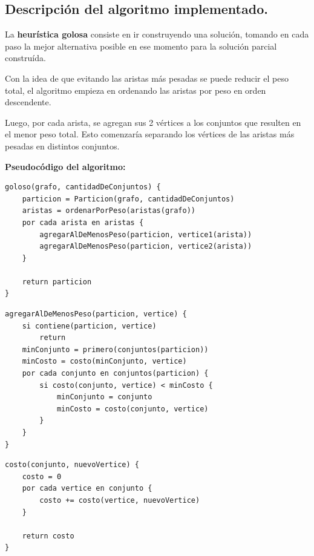 \subsection{Descripción del algoritmo implementado.}
\vspace*{0.3cm}

La \textbf{heurística golosa} consiste en ir construyendo una solución,
tomando en cada paso la mejor alternativa posible en ese momento para la
solución parcial construída.

Con la idea de que evitando las aristas más pesadas se puede reducir el peso
total, el algoritmo empieza en ordenando las aristas por peso en orden
descendente.

Luego, por cada arista, se agregan sus 2 vértices a los conjuntos que resulten en el menor peso total. Esto comenzaría separando los vértices
de las aristas más pesadas en distintos conjuntos.

\vspace*{0.5cm}

\textbf{Pseudocódigo del algoritmo:}

\vspace*{0.3cm}

\begin{verbatim}
goloso(grafo, cantidadDeConjuntos) {
    particion = Particion(grafo, cantidadDeConjuntos)
    aristas = ordenarPorPeso(aristas(grafo))
    por cada arista en aristas {
        agregarAlDeMenosPeso(particion, vertice1(arista))
        agregarAlDeMenosPeso(particion, vertice2(arista))
    }

    return particion
}
\end{verbatim}

\vspace*{0.3cm}

\begin{verbatim}
agregarAlDeMenosPeso(particion, vertice) {
    si contiene(particion, vertice)
        return
    minConjunto = primero(conjuntos(particion))
    minCosto = costo(minConjunto, vertice)
    por cada conjunto en conjuntos(particion) {
        si costo(conjunto, vertice) < minCosto {
            minConjunto = conjunto
            minCosto = costo(conjunto, vertice)
        }
    }
}
\end{verbatim}

\vspace*{0.3cm}

\begin{verbatim}
costo(conjunto, nuevoVertice) {
    costo = 0
    por cada vertice en conjunto {
        costo += costo(vertice, nuevoVertice)
    }

    return costo
}
\end{verbatim}


